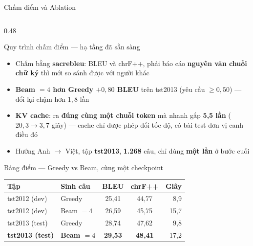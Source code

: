 \documentclass[aspectratio=169, 10pt]{beamer}
\newcommand{\bangchat}{\setlength{\tabcolsep}{3pt}}
\begin{document}
\begin{frame}[shrink=15]{Chấm điểm và Ablation}
  \begin{columns}[T]
    \begin{column}{0.48\textwidth}
      \begin{block}{Quy trình chấm điểm — hạ tầng đã sẵn sàng}
        \footnotesize
        \begin{itemize}
          \setlength{\itemsep}{0.15em}
          \item Chấm bằng \textbf{sacrebleu}: BLEU và chrF++, phải báo cáo
            \textbf{nguyên văn chuỗi chữ ký} thì mới so sánh được với người khác
          \item \textbf{Beam $=4$ hơn Greedy $+0{,}80$ BLEU} trên tst2013 (yêu cầu
            $\ge 0{,}50$) — đổi lại chậm hơn $1{,}8$ lần
          \item \textbf{KV cache}: ra \textbf{đúng cùng một chuỗi token} mà nhanh
            gấp \textbf{5{,}5 lần} ($20{,}3 \rightarrow 3{,}7$ giây) — cache chỉ
            được phép đổi tốc độ, có bài test đơn vị canh điều đó
          \item Hướng Anh $\rightarrow$ Việt, tập \textbf{tst2013}, \textbf{1.268} câu,
            chỉ dùng \textbf{một lần} ở bước cuối
        \end{itemize}
      \end{block}
      \begin{block}{Bảng điểm — Greedy vs Beam, cùng một checkpoint}
        \scriptsize\bangchat
        \begin{tabular}{@{}llccr@{}}
          \toprule
          \textbf{Tập} & \textbf{Sinh câu} & \textbf{BLEU} & \textbf{chrF++} &
          \textbf{Giây} \\
          \midrule
          tst2012 (dev)  & Greedy    & 25{,}41 & 44{,}77 & 8{,}9 \\
          tst2012 (dev)  & Beam $=4$ & 26{,}59 & 45{,}75 & 15{,}7 \\
          \midrule
          tst2013 (test) & Greedy    & 28{,}74 & 47{,}62 & 9{,}8 \\
          \textbf{tst2013 (test)} & \textbf{Beam $=4$} & \textbf{29{,}53} &
            \textbf{48{,}41} & 17{,}2 \\
          \bottomrule
        \end{tabular}
        \par\vspace{0.3em}

\end{block}
\end{column}
\end{columns}
\end{frame}
\end{document}

